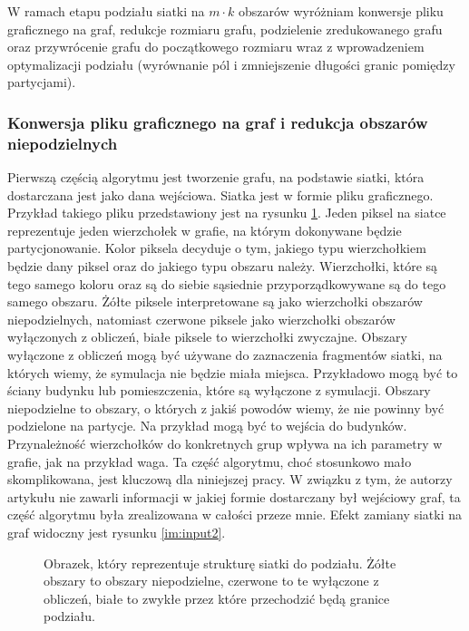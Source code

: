 W ramach etapu podziału siatki na $m \cdot k$ obszarów wyróżniam konwersje pliku graficznego na graf, redukcje rozmiaru grafu,
podzielenie zredukowanego grafu oraz przywrócenie grafu do początkowego rozmiaru wraz z wprowadzeniem optymalizacji podziału
(wyrównanie pól i zmniejszenie długości granic pomiędzy partycjami).

\subsubsection{Konwersja pliku graficznego na graf i redukcja obszarów niepodzielnych}

Pierwszą częścią algorytmu jest tworzenie grafu, na podstawie siatki, która dostarczana jest jako dana wejściowa.
Siatka jest w formie pliku graficznego.
Przykład takiego pliku przedstawiony jest na rysunku \ref{im:input}.
Jeden piksel na siatce reprezentuje jeden wierzchołek w grafie, na którym dokonywane będzie partycjonowanie.
Kolor piksela decyduje o tym, jakiego typu wierzchołkiem będzie dany piksel oraz do jakiego typu obszaru należy.
Wierzchołki, które są tego samego koloru oraz są do siebie sąsiednie przyporządkowywane są do tego samego obszaru.
Żółte piksele interpretowane są jako wierzchołki obszarów niepodzielnych, natomiast czerwone piksele
jako wierzchołki obszarów wyłączonych z obliczeń, białe piksele to wierzchołki zwyczajne.
Obszary wyłączone z obliczeń mogą być używane do zaznaczenia fragmentów siatki, na których wiemy, że symulacja
nie będzie miała miejsca.
Przykładowo mogą być to ściany budynku lub pomieszczenia, które są wyłączone z symulacji.
Obszary niepodzielne to obszary, o których z jakiś powodów wiemy, że nie powinny być podzielone na partycje.
Na przykład mogą być to wejścia do budynków.
Przynależność wierzchołków do konkretnych grup wpływa na ich parametry w grafie, jak na przykład waga.
Ta część algorytmu, choć stosunkowo mało skomplikowana, jest kluczową dla niniejszej pracy.
W związku z tym, że autorzy artykułu \cite{1364754} nie zawarli informacji w jakiej formie dostarczany był
wejściowy graf, ta część algorytmu była zrealizowana w całości przeze mnie.
Efekt zamiany siatki na graf widoczny jest rysunku \ref{im:input2}.

\begin{figure}[h]
    \centering
    \caption{Obrazek, który reprezentuje strukturę siatki do podziału. Żółte obszary to obszary niepodzielne, czerwone to
    te wyłączone z obliczeń, białe to zwykłe przez które przechodzić będą granice podziału.}
    \label{im:input}
\end{figure}

